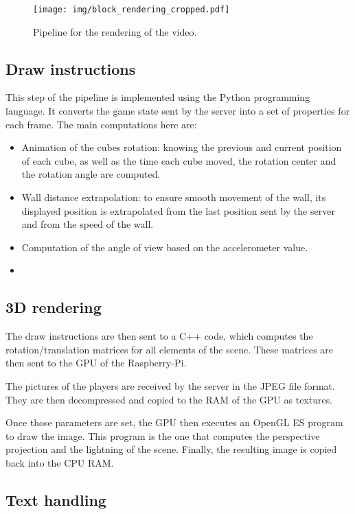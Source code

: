 \documentclass[english, DIV=13]{scrreprt}
\begin{document}
\begin{figure}[bth]
    \centering
    \texttt{[image: img/block\_rendering\_cropped.pdf]}
    \caption{Pipeline for the rendering of the video.}
    \label{fig:rendering}
\end{figure}

\subsection{Draw instructions}

This step of the pipeline is implemented using the Python programming language.
It converts the game state sent by the server into a set of properties for each
frame. The main computations here are:
\begin{itemize}
    \item Animation of the cubes rotation: knowing the previous and current
    position of each cube, as well as the time each cube moved, the rotation
    center and the rotation angle are computed.
    \item Wall distance extrapolation: to ensure smooth movement of the wall, its
    displayed position is extrapolated from the last position sent by the server
    and from the speed of the wall.
    \item Computation of the angle of view based on the accelerometer value.
    \item {}
\end{itemize}

\subsection{3D rendering}

The draw instructions are then sent to a C++ code, which computes the rotation/translation
matrices for all elements of the scene. These matrices are then sent to the GPU of the
Raspberry-Pi.

The pictures of the players are received by the server in the JPEG file format.
They are then decompressed and copied to the RAM of the GPU as textures.

Once those parameters are set, the GPU then executes an OpenGL ES program to draw the
image. This program is the one that computes the perspective projection and the lightning
of the scene.
Finally, the resulting image is copied back into the CPU RAM.

\subsection{Text handling}
\end{document}
